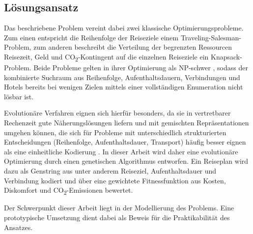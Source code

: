 \subsection{Lösungsansatz}

Das beschriebene Problem vereint dabei zwei klassische Optimierungsprobleme. Zum einen entspricht die Reihenfolge der Reiseziele einem Traveling-Salesman-Problem, zum anderen beschreibt die Verteilung der begrenzten Ressourcen Reisezeit, Geld und CO\textsubscript{2}-Kontingent auf die einzelnen Reiseziele ein Knapsack-Problem. Beide Probleme gelten in ihrer Optimierung als NP-schwer \cite[211, 247]{gareyJohnsonComputersIntractability1979}, sodass der kombinierte Suchraum aus Reihenfolge, Aufenthaltsdauern, Verbindungen und Hotels bereits bei wenigen Zielen mittels einer vollständigen Enumeration nicht lösbar ist.

Evolutionäre Verfahren eignen sich hierfür besonders, da sie in vertretbarer Rechenzeit gute Näherungslösungen liefern und mit gemischten Repräsentationen umgehen können, die sich für Probleme mit unterschiedlich strukturierten Entscheidungen (Reihenfolge, Aufenthaltsdauer, Transport) häufig besser eignen als eine einheitliche Kodierung \cite[49]{eibenSmithIntroductionEvolutionary2015}. In dieser Arbeit wird daher eine evolutionäre Optimierung durch einen genetischen Algorithmus entworfen. Ein Reiseplan wird dazu als Genstring aus unter anderem Reiseziel, Aufenthaltsdauer und Verbindung kodiert und über eine gewichtete Fitnessfunktion aus Kosten, Diskomfort und CO\textsubscript{2}-Emissionen bewertet.

Der Schwerpunkt dieser Arbeit liegt in der Modellierung des Problems. Eine prototypische Umsetzung dient dabei als Beweis für die Praktikabilität des Ansatzes.
